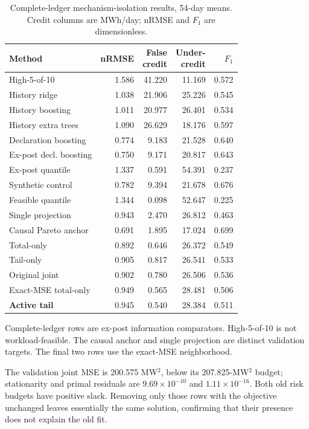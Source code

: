 \documentclass[10pt,journal]{IEEEtran}
\begin{document}
\begin{table}[t]
\centering
\caption{Complete-ledger mechanism-isolation results, 54-day means.
Credit columns are MWh/day; nRMSE and $F_1$ are dimensionless.}
\label{tab:base}
\footnotesize
\setlength{\tabcolsep}{3pt}
\begin{tabular}{@{}lrrrr@{}}
\toprule
Method & nRMSE & \shortstack{False\\credit} & \shortstack{Under-\\credit} & $F_1$\\
\midrule
High-5-of-10 & 1.586 & 41.220 & 11.169 & 0.572\\
History ridge & 1.038 & 21.906 & 25.226 & 0.545\\
History boosting & 1.011 & 20.977 & 26.401 & 0.534\\
History extra trees & 1.090 & 26.629 & 18.176 & 0.597\\
Declaration boosting & 0.774 & 9.183 & 21.528 & 0.640\\
Ex-post decl. boosting & 0.750 & 9.171 & 20.817 & 0.643\\
Ex-post quantile & 1.337 & 0.591 & 54.391 & 0.237\\
Synthetic control & 0.782 & 9.394 & 21.678 & 0.676\\
Feasible quantile & 1.344 & 0.098 & 52.647 & 0.225\\
Single projection & 0.943 & 2.470 & 26.812 & 0.463\\
Causal Pareto anchor & 0.691 & 1.895 & 17.024 & 0.699\\
Total-only & 0.892 & 0.646 & 26.372 & 0.549\\
Tail-only & 0.905 & 0.817 & 26.541 & 0.533\\
Original joint & 0.902 & 0.780 & 26.506 & 0.536\\
\midrule
Exact-MSE total-only & 0.949 & 0.565 & 28.481 & 0.506\\
\textbf{Active tail} & 0.945 & 0.540 & 28.384 & 0.511\\
\bottomrule
\end{tabular}
\vspace{3pt}
\parbox{\columnwidth}{\footnotesize Complete-ledger rows are ex-post information
comparators. High-5-of-10 is not workload-feasible. The causal anchor and
single projection are distinct validation targets. The final two rows use the
exact-MSE neighborhood.}
\end{table}


The validation joint MSE is 200.575 MW$^2$, below its 207.825-MW$^2$ budget;
stationarity and primal residuals are $9.69\times10^{-10}$ and
$1.11\times10^{-16}$. Both old risk budgets have positive slack. Removing
only those rows with the objective unchanged leaves essentially the same
solution, confirming that their presence does not explain the old fit.
\end{document}
